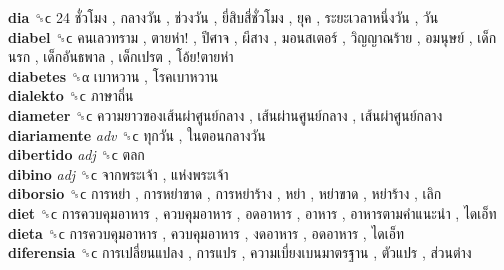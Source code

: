 \textbf{dia} ␝ϲ   24 ชั่วโมง ,  กลางวัน ,  ช่วงวัน ,  ยี่สิบสี่ชั่วโมง ,  ยุค ,  ระยะเวลาหนึ่งวัน ,  วัน   \\
\textbf{diabel} ␝ϲ   คนเลวทราม ,  ตายห่า! ,  ปีศาจ ,  ผีสาง ,  มอนสเตอร์ ,  วิญญาณร้าย ,  อมนุษย์ ,  เด็กนรก ,  เด็กอันธพาล ,  เด็กเปรต ,  โอ้ย!ตายห่า   \\
\textbf{diabetes} ␝α   เบาหวาน ,  โรคเบาหวาน   \\
\textbf{dialekto} ␝ϲ   ภาษาถิ่น   \\
\textbf{diameter} ␝ϲ   ความยาวของเส้นผ่าศูนย์กลาง ,  เส้นผ่านศูนย์กลาง ,  เส้นผ่าศูนย์กลาง   \\
\textbf{diariamente} \emph{adv}  ␝ϲ   ทุกวัน ,  ในตอนกลางวัน   \\
\textbf{dibertido} \emph{adj}  ␝ϲ   ตลก   \\
\textbf{dibino} \emph{adj}  ␝ϲ   จากพระเจ้า ,  แห่งพระเจ้า   \\
\textbf{diborsio} ␝ϲ   การหย่า ,  การหย่าขาด ,  การหย่าร้าง ,  หย่า ,  หย่าขาด ,  หย่าร้าง ,  เลิก   \\
\textbf{diet} ␝ϲ   การควบคุมอาหาร ,  ควบคุมอาหาร ,  อดอาหาร ,  อาหาร ,  อาหารตามคำแนะนำ ,  ไดเอ็ท   \\
\textbf{dieta} ␝ϲ   การควบคุมอาหาร ,  ควบคุมอาหาร ,  งดอาหาร ,  อดอาหาร ,  ไดเอ็ท   \\
\textbf{diferensia} ␝ϲ   การเปลี่ยนแปลง ,  การแปร ,  ความเบี่ยงเบนมาตรฐาน ,  ตัวแปร ,  ส่วนต่าง   \\
